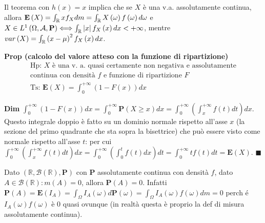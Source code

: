 \documentclass{article}
\begin{document}
Il teorema con $h\left( x\right) =x$ implica che se $X$ \`{e} una v.a.
assolutamente continua, allora $\mathbf{E}\left( X\right) =\int_{%
\mathbb{R}
}xf_{X}dm=\int_{%
\mathbb{R}
}X\left( \omega \right) f\left( \omega \right) d\omega $ e $X\in L^{1}\left(
\Omega ,\mathcal{A},\mathbf{P}\right) \Longleftrightarrow \int_{%
\mathbb{R}
}\left\vert x\right\vert f_{X}\left( x\right) dx<+\infty $, mentre $%
var\left( X\right) =\int_{%
\mathbb{R}
}\left( x-\mu \right) ^{2}f_{X}\left( x\right) dx$.

\textbf{Prop (calcolo del valore atteso con la funzione di ripartizione)}%
\begin{gather*}
\text{Hp: }X\text{ \`{e} una v. a. quasi certamente non negativa e
assolutamente} \\
\text{continua con densit\`{a} }f\text{ e funzione di ripartizione }F \\
\text{Ts: }\mathbf{E}\left( X\right) =\int_{0}^{+\infty }\left( 1-F\left(
x\right) \right) dx
\end{gather*}

\textbf{Dim} $\int_{0}^{+\infty }\left( 1-F\left( x\right) \right)
dx=\int_{0}^{+\infty }\mathbf{P}\left( X\geq x\right) dx=\int_{0}^{+\infty
}\left( \int_{x}^{+\infty }f\left( t\right) dt\right) dx$. Questo integrale
doppio \`{e} fatto su un dominio normale rispetto all'asse $x$ (la sezione
del primo quadrante che sta sopra la bisettrice) che pu\`{o} essere visto
come normale rispetto all'asse $t$: per cui $\int_{0}^{+\infty }\left(
\int_{x}^{+\infty }f\left( t\right) dt\right) dx=\int_{0}^{+\infty }\left(
\int_{0}^{t}f\left( t\right) dx\right) dt=\int_{0}^{+\infty }tf\left(
t\right) dt=\mathbf{E}\left( X\right) $. $\blacksquare $

Dato $\left( 
\mathbb{R}
,\mathcal{B}\left( 
\mathbb{R}
\right) ,\mathbf{P}\right) $ con $\mathbf{P}$ assolutamente continua con
densit\`{a} $f$, dato $A\in \mathcal{B}\left( 
\mathbb{R}
\right) :m\left( A\right) =0$, allora $\mathbf{P}\left( A\right) =0$.
Infatti $\mathbf{P}\left( A\right) =\mathbf{E}\left( I_{A}\right)
=\int_{\Omega }I_{A}\left( \omega \right) d\mathbf{P}\left( \omega \right)
=\int_{\Omega }I_{A}\left( \omega \right) f\left( \omega \right) dm=0$ perch%
\'{e} $I_{A}\left( \omega \right) f\left( \omega \right) $ \`{e} $0$ quasi
ovunque (in realt\`{a} questa \`{e} proprio la def di misura assolutamente
continua).
\end{document}
